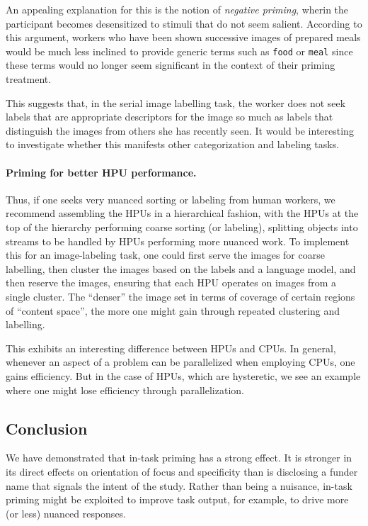 \documentclass[a4paper]{report}
\begin{document}
An appealing explanation for 
this is the notion of \textit{negative priming}, wherin the participant
becomes desensitized to stimuli that do not seem salient.  According to this 
argument, workers who have been shown successive images of prepared meals 
would be much less inclined to provide generic terms such as \texttt{food} or 
\texttt{meal} since these terms would no longer seem significant in the 
context of their priming treatment.  

This suggests that, in the serial image labelling task, the worker
does not seek labels that are appropriate descriptors for the image so much 
as labels that distinguish the images from others she has recently seen.
It would be interesting to investigate whether this manifests other 
categorization and labeling tasks.

\paragraph{Priming for better HPU performance.}
Thus, if one seeks very nuanced sorting or labeling from human workers, 
we recommend assembling the HPUs in a hierarchical fashion, with the 
HPUs at the top of the hierarchy performing coarse sorting (or labeling), 
splitting objects into streams to be handled by HPUs performing more nuanced 
work.  To implement this for an
image-labeling task, one could first serve the images for coarse labelling,
then cluster the images based on the labels and a language model, and then 
reserve the images, ensuring that each HPU operates on images from a single 
cluster.  The ``denser'' the image set in terms of coverage of certain
regions of ``content space'', the more one might gain through repeated 
clustering and labelling.

This exhibits an interesting difference between HPUs and CPUs.  In general,
whenever an aspect of a problem can be parallelized when employing CPUs, one
gains efficiency.  But in the case of HPUs, which are hysteretic, we see an 
example where one might lose efficiency through parallelization.

\subsection*{Conclusion}
We have demonstrated that in-task priming has a strong effect.  It is stronger
in its direct effects on orientation of focus and specificity than is 
disclosing a funder name that signals the intent of the study.  
Rather than being a nuisance, in-task priming might be exploited to improve
task output, for example, to drive more (or less) nuanced responses.
\end{document}
